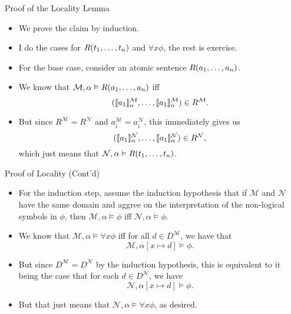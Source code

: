 \documentclass[../slides.tex]{subfiles}
\begin{document}
\begin{frame}{Proof of the Locality Lemma}

  \begin{itemize}
  \item We prove the claim by induction.
    \item I do the cases for $R(t_1, \mathellipsis, t_n)$ and $\forall
      x\phi$, the rest is exercise.
      \item For the base case, consider an atomic sentence $R(a_1,
        \mathellipsis, a_n)$.
        \item We know that $\mathcal{M},\alpha\vDash
          R(a_1,\mathellipsis, a_n)$ iff \[(\llbracket
                  a_1\rrbracket_\alpha^\mathcal{M}, \mathellipsis,
                  \llbracket a_1\rrbracket_\alpha^\mathcal{M}) \in
                  R^\mathcal{M}.\]
                  \item But since $R^\mathcal{M}=R^\mathcal{N}$ and
                    $a_i^\mathcal{M}=a_i^\mathcal{N}$, this immediately
                    gives us \[(\llbracket
                  a_1\rrbracket_\alpha^\mathcal{N}, \mathellipsis,
                  \llbracket a_1\rrbracket_\alpha^\mathcal{N}) \in
                  R^\mathcal{N},\] which just means that
                $\mathcal{N},\alpha\vDash R(t_1, \mathellipsis, t_n)$.
  \end{itemize}
  
\end{frame}

\begin{frame}{Proof of Locality (Cont'd)}

  \begin{itemize}
  \item For the induction step, assume the induction hypothesis that
    if $\mathcal{M}$ and 
    $\mathcal{N}$ have the same domain and aggree on the
    interpretation of the non-logical 
    symbols in $\phi$, then $\mathcal{M},\alpha\vDash \phi$ iff
    $\mathcal{N},\alpha\vDash\phi$.

  \item We know that $\mathcal{M},\alpha\vDash\forall x\phi$ iff for
    all $d\in D^\mathcal{M}$, we have that
    \[\mathcal{M},\alpha[x\mapsto d]\vDash\phi.\]

    \item But since $D^\mathcal{M}=D^\mathcal{N}$ by the induction
      hypothesis, this is equivalent to it being the case that  for each $d\in D^\mathcal{N}$, we
      have  \[\mathcal{N},\alpha[x\mapsto d]\vDash\phi.\]

      \item But that just means that $\mathcal{N},\alpha\vDash \forall
        x\phi$, as desired.
    
  \end{itemize}
  
\end{frame}
\end{document}
